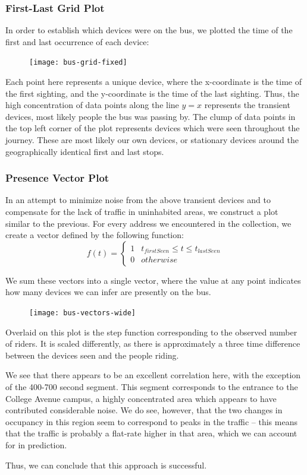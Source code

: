 \subsubsection*{First-Last Grid Plot}
In order to establish which devices were on the bus, we plotted the time of the first and last occurrence of each device:

\begin{figure}[!t]
  \texttt{[image: bus-grid-fixed]}
\end{figure}

Each point here represents a unique device, where the x-coordinate is the time of the first sighting, and the y-coordinate is the time of the last sighting.
Thus, the high concentration of data points along the line \(y=x\) represents the transient devices, most likely people the bus was passing by.
The clump of data points in the top left corner of the plot represents devices which were seen throughout the journey.
These are most likely our own devices, or stationary devices around the geographically identical first and last stops.

\subsubsection*{Presence Vector Plot}
In an attempt to minimize noise from the above transient devices and to compensate for the lack of traffic in uninhabited areas, we construct a plot similar to the previous. %
For every address we encountered in the collection, we create a vector defined by the following function:
\begin{equation*}
  f(t) = \begin{cases}
    1 & t_{firstSeen} \le t \le t_{lastSeen}\\
    0 & otherwise
  \end{cases}
\end{equation*}

We sum these vectors into a single vector, where the value at any point indicates how many devices we can infer are presently on the bus.

\begin{figure}[!t]
  \texttt{[image: bus-vectors-wide]}
\end{figure}

Overlaid on this plot is the step function corresponding to the observed number of riders.
It is scaled differently, as there is approximately a three time difference between the devices seen and the people riding.

We see that there appears to be an excellent correlation here, with the exception of the 400-700 second segment. %
This segment corresponds to the entrance to the College Avenue campus, a highly concentrated area which appears to have contributed considerable noise.
We do see, however, that the two changes in occupancy in this region seem to correspond to peaks in the traffic -- this means that the traffic is probably a flat-rate higher in that area, which we can account for in prediction.
		
Thus, we can conclude that this approach is successful. %
